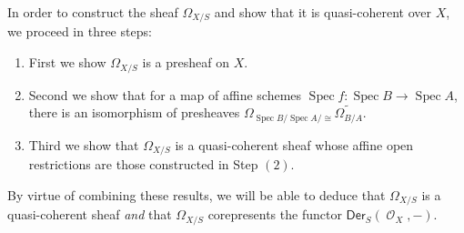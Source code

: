 \documentclass{amsart}
\theoremstyle{definition}
\DeclareMathOperator{\Ocal}{\mathcal{O}}
\DeclareMathOperator{\Spec}{Spec}
\newcommand{\Kah}[2]{\Omega_{{#1}/{#2}}}
\numberwithin{equation}{subsection}
\begin{document}
In order to construct the sheaf $\Kah{X}{S}$ and show that it is quasi-coherent over $X$, we proceed in three steps:
\begin{enumerate}
	\item First we show $\Kah{X}{S}$ is a presheaf on $X$.
	\item Second we show that for a map of affine schemes $\Spec f:\Spec B \to \Spec A$, there is an isomorphism of presheaves $\Kah{\Spec B/\Spec A} \cong \widetilde{\Kah{B}{A}}$.
	\item Third we show that $\Kah{X}{S}$ is a quasi-coherent sheaf whose affine open restrictions are those constructed in Step $(2)$.
\end{enumerate}
By virtue of combining these results, we will be able to deduce that $\Kah{X}{S}$ is a quasi-coherent sheaf \emph{and} that $\Kah{X}{S}$ corepresents the functor $\mathsf{Der}_S(\Ocal_X,-)$.
\end{document}
